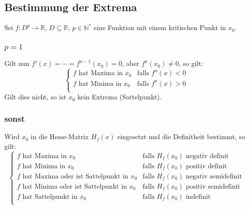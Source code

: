 \documentclass[a4paper, 11pt, accentcolor = tud3b]{tudreport}
\begin{document}
            \subsection{Bestimmung der Extrema}
                Sei $ f : D ^ p \rightarrow \mathbb{R} $, $ D \subseteq \mathbb{R} $, $ p \in \mathbb{N} ^ * $ eine Funktion mit einem kritischen Punkt in $ x _ 0 $.

                \subsubsection{$ p = 1 $}
                    Gilt nun $ f'(x) = \cdots = f ^ { n - 1 } (x _ 0) = 0 $, aber $ f ^ n (x _ 0) \neq 0 $, so gilt:
                    \begin{equation*}
                        \begin{cases}
                            f \text{ hat Maxima in } x _ 0 & \text{falls } f ^ n (x) < 0 \\
                            f \text{ hat Minima in } x _ 0 & \text{falls } f ^ n (x) > 0 \\
                        \end{cases}
                    \end{equation*}
                    Gilt dies nicht, so ist $ x _ 0 $ kein Extrema (Sattelpunkt).

                \subsubsection{sonst}
                    Wird $ x _ 0 $ in die Hesse-Matrix $ H _ f (x) $ eingesetzt und die Definitheit bestimmt, so gilt:
                    \begin{equation*}
                        \begin{cases}
                            f \text{ hat Maxima in } x _ 0 & \text{falls } H _ f (x _ 0) \text{ negativ definit} \\
                            f \text{ hat Minima in } x _ 0 & \text{falls } H _ f (x _ 0) \text{ positiv definit} \\
                            f \text{ hat Maxima oder ist Sattelpunkt in } x _ 0 & \text{falls } H _ f (x _ 0) \text{ negativ semidefinit} \\
                            f \text{ hat Minima oder ist Sattelpunkt in } x _ 0 & \text{falls } H _ f (x _ 0) \text{ positiv semidefinit} \\
                            f \text{ hat Sattelpunkt in } x _ 0 & \text{falls } H _ f (x _ 0) \text{ indefinit} \\
                        \end{cases}
                    \end{equation*}
\end{document}
